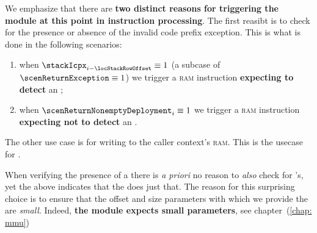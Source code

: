 \saNote{} \label{hub: instruction handling: halting: return: desired trigger flags}
We emphasize that there are \textbf{two distinct reasons for triggering the \mmuMod{} module at this point in instruction processing}.
The first reasibt is to check for the presence or absence of the invalid code prefix exception.
This is what is done in the following scenarios:
\begin{enumerate}
	\item when $\stackIcpx _{i - \locStackRowOffset} \equiv 1$ (a subcase of $\scenReturnException \equiv 1$) we trigger a \textsc{ram} instruction \textbf{expecting to detect} an \icpxSH{};
	\item when $\scenReturnNonemptyDeployment _{i} \equiv 1$ we trigger a \textsc{ram} instruction \textbf{expecting not to detect} an \icpxSH{}.
\end{enumerate}
The other use case is for writing to the caller context's \textsc{ram}.
This is the usecase for \scenReturnFromMessageCallWillTouchRam{}.

\saNote{} \label{hub: instruction handling: halting: return: why icpx requires an mxp instruction}
When verifying the presence of a \icpxSH{} there is \emph{a priori} no reason to \emph{also} check for \mxpxSH{}'s, yet the above indicates that the \zkEvm{} does just that.
The reason for this surprising choice is to ensure that the offset and size parameters with which we provide the \mmuMod{} are \emph{small}.
Indeed, \textbf{the \mmuMod{} module expects small parameters}, see chapter~(\ref{chap: mmu})

